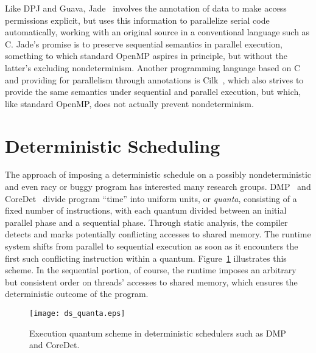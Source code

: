 Like DPJ and Guava, Jade~\cite{rinard98jade} involves the annotation of data to make access permissions explicit, but uses this information to parallelize serial code automatically, working with an original source in a conventional language such as C.  Jade's promise is to preserve sequential semantics in parallel execution, something to which standard OpenMP aspires in principle, but without the latter's excluding nondeterminism.  Another programming language based on C and providing for parallelism through annotations is Cilk~\cite{blumofe95cilk,leiserson97cilk,frigo98cilk}, which also strives to provide the same semantics under sequential and parallel execution, but which, like standard OpenMP, does not actually prevent nondeterminism.

\section{Deterministic Scheduling}
The approach of imposing a deterministic schedule on a possibly nondeterministic and even racy or buggy program has interested many research groups.  DMP~\cite{devietti09dmp} and CoreDet~\cite{bergan10coredet} divide program ``time'' into uniform units, or \textit{quanta}, consisting of a fixed number of instructions, with each quantum divided between an initial parallel phase and a sequential phase.   Through static analysis, the compiler detects and marks potentially conflicting accesses to shared memory.  The runtime system shifts from parallel to sequential execution as soon as it encounters the first such conflicting instruction within a quantum.  Figure~\ref{fig:background-ds-quanta} illustrates this scheme.  In the sequential portion, of course, the runtime imposes an arbitrary but consistent order on threads' accesses to shared memory, which ensures the deterministic outcome of the program.
\begin{figure}
\centering
\texttt{[image: ds\_quanta.eps]}
\caption{Execution quantum scheme in deterministic schedulers such as DMP and CoreDet.}
\label{fig:background-ds-quanta}
\end{figure}

